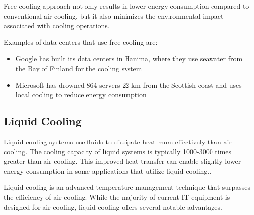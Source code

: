 \documentclass[
  a4paper,  %
  twoside,  %
  bibliography=totoc,
  headsepline,
  cleardoublepage=empty,
  parskip=half,
  draft=false
]{scrbook}
\begin{document}
Free cooling approach not only results in lower energy consumption compared to conventional air cooling, but it also minimizes the environmental impact associated with cooling operations\cite{datacenterdynamicsExploringData}.

Examples of data centers that use free cooling are:
\begin{itemize}
	\item Google has built its data centers in Hanima, where they use seawater from the Bay of Finland for the cooling system\cite{datacentersGoogleData}
	\item Microsoft has drowned 864 servers 22 km from the Scottish coast and uses local cooling to reduce energy consumption\cite{qzNewestGreentech}
\end{itemize}



\subsection{Liquid Cooling}

Liquid cooling systems use fluids to dissipate heat more effectively than air cooling. The cooling capacity of liquid systems is typically 1000-3000 times greater than air cooling. This improved heat transfer can enable slightly lower energy consumption in some applications that utilize liquid cooling.\cite{ZHU2023104322}.



Liquid cooling is an advanced temperature management technique that surpasses the efficiency of air cooling. While the majority of current IT equipment is designed for air cooling, liquid cooling offers several notable advantages\cite{xu2023thermal}.
\end{document}
